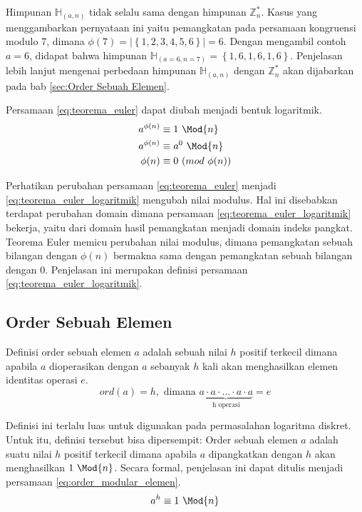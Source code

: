 Himpunan $ \mathbb{H}_{(a, n)} $ tidak selalu sama dengan himpunan $ \mathbb{Z}_n^{*} $. Kasus yang menggambarkan pernyataan ini yaitu pemangkatan pada persamaan kongruensi modulo 7, dimana $ \phi(7)=\left|\left\{1,2,3,4,5,6\right\}\right|\allowbreak=6 $. Dengan mengambil contoh $ a=6 $, didapat bahwa himpunan $ \mathbb{H}_{(a=6,n=7)}=\left\{1,6,1,6,1,6\right\} $. Penjelasan lebih lanjut mengenai perbedaan himpunan $ \mathbb{H}_{(a, n)} $ dengan $ \mathbb{Z}_n^{*} $ akan dijabarkan pada bab \ref{sec:Order Sebuah Elemen}.

Persamaan \eqref{eq:teorema_euler} dapat diubah menjadi bentuk logaritmik.
\begin{align}
a^{\phi(n)} &\equiv 1\ \Mod{n} \\
a^{\phi(n)} &\equiv a^0\ \Mod{n} \\
\phi(n) &\equiv 0\ (mod\ \phi(n))
\label{eq:teorema_euler_logaritmik}
\end{align}

Perhatikan perubahan persamaan \eqref{eq:teorema_euler} menjadi \eqref{eq:teorema_euler_logaritmik} mengubah nilai modulus. Hal ini disebabkan terdapat perubahan domain dimana persamaan \eqref{eq:teorema_euler_logaritmik} bekerja, yaitu dari domain hasil pemangkatan menjadi domain indeks pangkat. Teorema Euler memicu perubahan nilai modulus, dimana pemangkatan sebuah bilangan dengan $ \phi(n) $ bermakna sama dengan pemangkatan sebuah bilangan dengan $ 0 $. Penjelasan ini merupakan definisi persamaan \eqref{eq:teorema_euler_logaritmik}.

\subsection{ Order Sebuah Elemen}

Definisi order sebuah elemen $ a $ adalah sebuah nilai $ h $ positif terkecil dimana apabila $ a $ dioperasikan dengan $ a $ sebanyak $ h $ kali akan menghasilkan elemen identitas operasi $ e $.\cite{harald_applied_number_theory}
\begin{equation}
ord(a)=h,\text{ dimana }\underbrace{a\cdot a\cdot\ldots\cdot a\cdot a}_{\text{h operasi}}=e
\label{eq:order_elemen}
\end{equation}

Definisi ini terlalu luas untuk digunakan pada permasalahan logaritma diskret. Untuk itu, definisi tersebut bisa dipersempit: Order sebuah elemen $ a $ adalah suatu nilai $ h $ positif terkecil dimana apabila $ a $ dipangkatkan dengan $ h $ akan menghasilkan $ 1\ \Mod{n} $. Secara formal, penjelasan ini dapat ditulis menjadi persamaan \eqref{eq:order_modular_elemen}.
\begin{equation}
a^h\equiv 1\ \Mod{n}
\label{eq:order_modular_elemen}
\end{equation}


